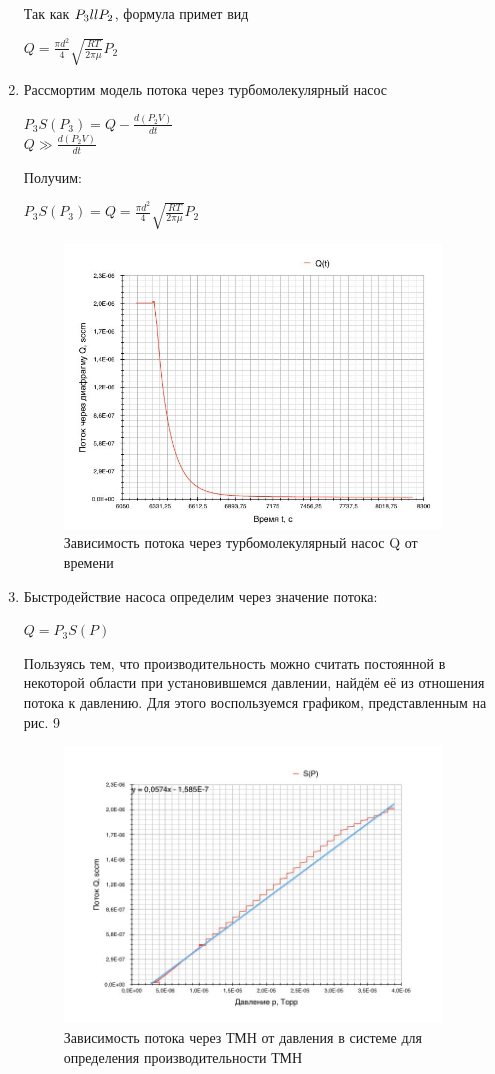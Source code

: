 \documentclass{article}
\begin{document}
\begin{enumerate}
Так как $P_3 \\ll P_2$, формула примет вид
\begin{center}
$Q = \frac{\pi d^2}{4}\sqrt{\frac{RT}{2\pi\mu}}P_2$
\end{center}
\item Рассмортим модель потока через турбомолекулярный насос
\begin{center}
$P_3S(P_3) = Q - \frac{d(P_2V)}{dt}$\\
$Q \gg \frac{d(P_2V)}{dt}$
\end{center}
Получим:
\begin{center}
$P_3S(P_3) = Q = \frac{\pi d^2}{4}\sqrt{\frac{RT}{2\pi\mu}}P_2$
\end{center}

  \begin{figure}[H]
    \centering
    \includegraphics[width=10cm]{stream.jpg}
    \caption{Зависимость потока через турбомолекулярный насос Q от времени}
    \label{fig:vac}
\end{figure}

\item Быстродействие насоса определим через значение потока:
\begin{center}
$Q = P_3S(P)$
\end{center}
Пользуясь тем, что производительность можно считать постоянной в некоторой области при установившемся давлении, найдём её из отношения потока к давлению. Для этого воспользуемся графиком, представленным на рис. 9
  \begin{figure}[H]
    \centering
    \includegraphics[width=10cm]{productivity.jpg}
    \caption{Зависимость потока через ТМН от давления в системе для определения производительности ТМН}
    \label{fig:vac}
\end{figure}


\end{enumerate}
\end{document}
